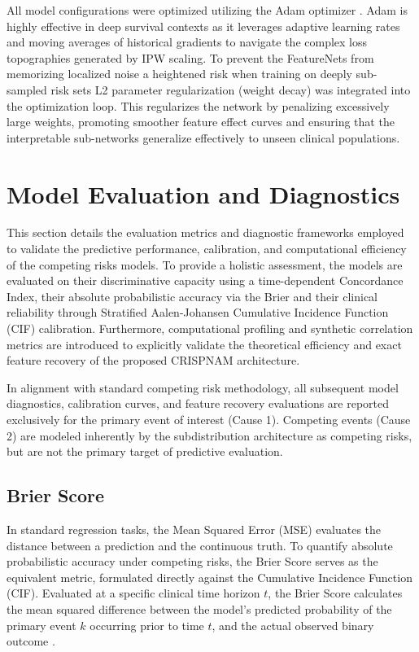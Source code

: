 \documentclass[a4paper,twoside,12pt]{report}
\begin{document}
All model configurations were optimized utilizing the Adam optimizer \citep{kingma2014adam}. Adam is highly effective in deep survival contexts as it leverages adaptive learning rates and moving averages of historical gradients to navigate the complex loss topographies generated by IPW scaling. To prevent the FeatureNets from memorizing localized noise a heightened risk when training on deeply sub-sampled risk sets L2 parameter regularization (weight decay) was integrated into the optimization loop. This regularizes the network by penalizing excessively large weights, promoting smoother feature effect curves and ensuring that the interpretable sub-networks generalize effectively to unseen clinical populations.


\section{Model Evaluation and Diagnostics}

This section details the evaluation metrics and diagnostic frameworks employed to validate the predictive performance, calibration, and computational efficiency of the competing risks models. To provide a holistic assessment, the models are evaluated on their discriminative capacity using a time-dependent Concordance Index, their absolute probabilistic accuracy via the Brier and their clinical reliability through Stratified Aalen-Johansen Cumulative Incidence Function (CIF) calibration. Furthermore, computational profiling and synthetic correlation metrics are introduced to explicitly validate the theoretical efficiency and exact feature recovery of the proposed CRISPNAM architecture.

In alignment with standard competing risk methodology, all subsequent model diagnostics, calibration curves, and feature recovery evaluations are reported exclusively for the primary event of interest (Cause 1). Competing events (Cause 2) are modeled inherently by the subdistribution architecture as competing risks, but are not the primary target of predictive evaluation.

\subsection{Brier Score}
In standard regression tasks, the Mean Squared Error (MSE) evaluates the distance between a prediction and the continuous truth. To quantify absolute probabilistic accuracy under competing risks, the Brier Score serves as the equivalent metric, formulated directly against the Cumulative Incidence Function (CIF). Evaluated at a specific clinical time horizon $t$, the Brier Score calculates the mean squared difference between the model's predicted probability of the primary event $k$ occurring prior to time $t$, and the actual observed binary outcome \citep{Graf1999}.
\end{document}
